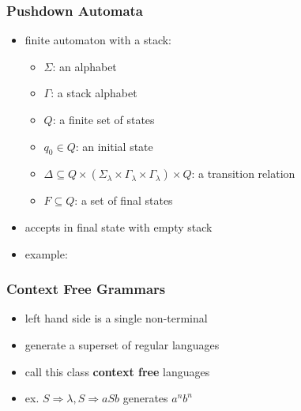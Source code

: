 \documentclass{beamer}
\begin{document}
\begin{frame}
\frametitle{Pushdown Automata}
\begin{itemize}
\item finite automaton with a stack:
  \begin{itemize}
  \item $\Sigma$: an alphabet
  \item $\Gamma$: a stack alphabet
  \item $Q$: a finite set of states
  \item $q_0 \in Q$: an initial state
  \item $\Delta \subseteq Q \times (\Sigma_\lambda \times \Gamma_\lambda \times
    \Gamma_\lambda) \times Q$: a transition relation
  \item $F \subseteq Q$: a set of final states
  \end{itemize}
\item accepts in final state with empty stack
  \item example:
\end{itemize}
\begin{figure}
  \centering
{}
  \end{figure}
\end{frame}


\begin{frame}
\frametitle{Context Free Grammars}
\begin{itemize}
\item left hand side is a single non-terminal
\item generate a superset of regular languages
\item call this class \textbf{context free} languages
\item ex. $S \Rightarrow \lambda, S \Rightarrow aSb$ generates $a^nb^n$
\end{itemize}
\end{frame}
\end{document}

